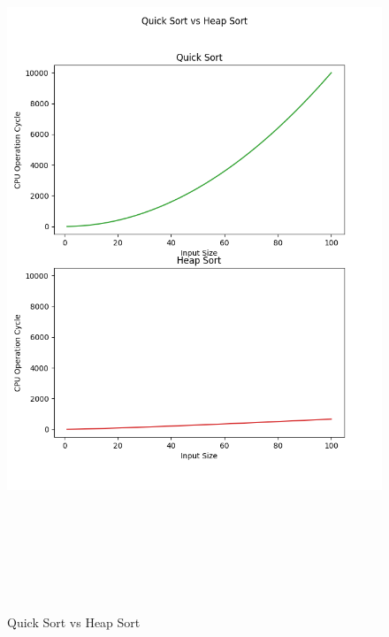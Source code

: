 \documentclass{article}
\begin{document}
\begin{figure}[h]
    \centerline{\includegraphics[width=7in,height=8.5in]{Quick Sort_Heap Sort.png}}
    \caption{Quick Sort vs Heap Sort}
\end{figure}
\end{document}
